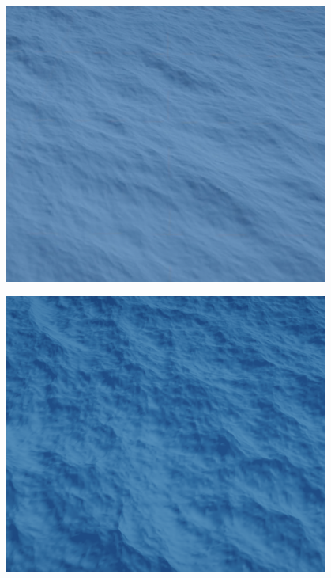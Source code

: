 \begin{minipage}{0.48\textwidth}
    \centering
    \includegraphics[width=0.8\textwidth]{"images/phillip_spectrum_comp.png"}
    \label{fig:phillip_spectrum_comp}
\end{minipage}
\hfill
\begin{minipage}{0.48\textwidth}
    \centering
    \includegraphics[width=0.8\textwidth]{"images/tma_spectrum_comp.png"}
    \label{fig:tma_spectrum_comp}
\end{minipage}


